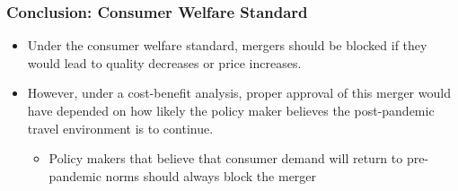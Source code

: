 \documentclass[xcolor=dvipsnames]{beamer}
\begin{document}
    \begin{frame}
        \frametitle{Conclusion: Consumer Welfare Standard}
        \begin{itemize}
            \item Under the consumer welfare standard, mergers should be blocked if they would lead to quality decreases or price increases.
            \item However, under a cost-benefit analysis, proper approval of this merger would have depended on how likely the policy maker believes the post-pandemic travel environment is to continue.
            \begin{itemize}
                \item Policy makers that believe that consumer demand will return to pre-pandemic norms should always block the merger
            \end{itemize}
        \end{itemize}
    \end{frame}


    \printbibliography
%	
\end{document}
